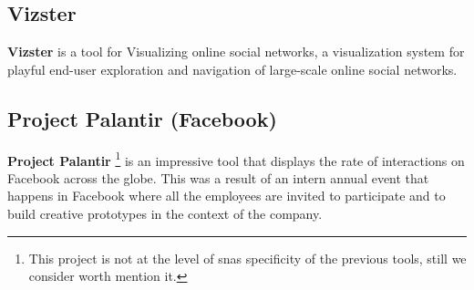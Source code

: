 \subsection{Vizster}

\textbf{Vizster} \citep{heer2005vizster} is a tool for Visualizing online social networks, a visualization system for playful end-user exploration and navigation of large-scale online social networks.

\subsection{Project Palantir (Facebook)}

\textbf{Project Palantir} \citep{project-palantir} \footnote{This project is not at the level of \glspl{sna} specificity of the previous tools, still we consider worth mention it.} is an impressive tool that displays the rate of interactions on Facebook across the globe. This was a result of an intern annual event that happens in Facebook where all the employees are invited to participate and to build creative prototypes in the context of the company.
